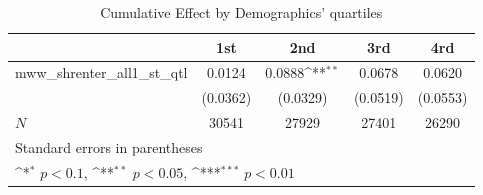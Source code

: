 \begin{table}[htbp]\centering
\def\sym#1{\ifmmode^{#1}\else\(^{#1}\)\fi}
\caption{Cumulative Effect by Demographics' quartiles}
\begin{tabular}{l*{4}{c}}
\hline\hline
            &\multicolumn{1}{c}{1st}&\multicolumn{1}{c}{2nd}&\multicolumn{1}{c}{3rd}&\multicolumn{1}{c}{4rd}\\
\hline
mww\_shrenter\_all1\_st\_qtl&      0.0124         &      0.0888\sym{**} &      0.0678         &      0.0620         \\
            &    (0.0362)         &    (0.0329)         &    (0.0519)         &    (0.0553)         \\
\hline
\(N\)       &       30541         &       27929         &       27401         &       26290         \\
\hline\hline
\multicolumn{5}{l}{\footnotesize Standard errors in parentheses}\\
\multicolumn{5}{l}{\footnotesize \sym{*} \(p<0.1\), \sym{**} \(p<0.05\), \sym{***} \(p<0.01\)}\\
\end{tabular}
\end{table}
